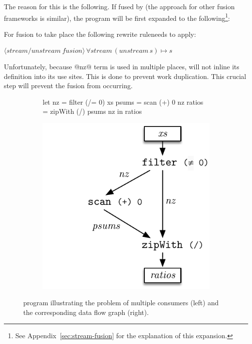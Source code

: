 \documentclass[preamble.tex]{subfiles}
\begin{document}
The reason for this is the following. If fused by \StreamFusion\isf (the approach for other fusion frameworks is similar), the program will be first expanded to the following\footnote{See Appendix~\ref{sec:stream-fusion} for the explanation of this expansion.}:


For fusion to take place the following rewrite rule\irwrules needs to apply:

$\langle {}\rangle\, \forall stream\, (unstream\, s)\mapsto s$

Unfortunately, because @nz@ term is used in multiple places, \GHC will not inline its definition into its use sites. This is done to prevent work duplication. This crucial step will prevent the fusion from occurring.

\begin{figure}

\begin{subfigure}{.5\textwidth}%
\begin{hscode}
let nz     = filter (/= 0) xs
    psums  = scan (+) 0 nz
    ratios = zipWith (/) psums nz
in  ratios
\end{hscode}
\end{subfigure}%
%
\begin{subfigure}{.5\textwidth}%
\includegraphics[center,scale=\omniscale]{img/DFD-ratios}%
\end{subfigure}%

\caption{ program illustrating the problem of multiple consumers (left) and the corresponding data flow graph (right).}
\label{fig:ratios}
\end{figure}
\end{document}
